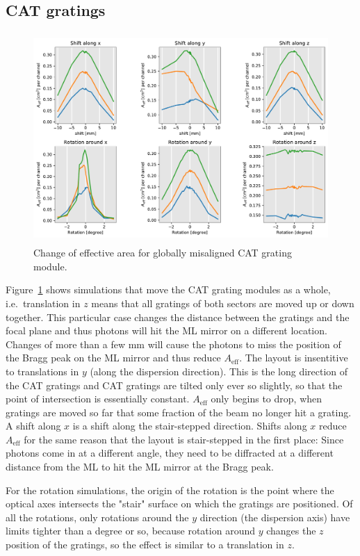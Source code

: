 \documentclass[]{spie}  %
\begin{document}
\subsection{CAT gratings}
\begin{figure} [ht]
  \begin{center}
    \includegraphics[height=8cm]{CAT_global.pdf}
  \end{center}
  \caption
      { \label{fig:CAT_global}Change of effective area for globally misaligned CAT grating module. 
}
\end{figure}
Figure~\ref{fig:CAT_global} shows simulations that move the CAT grating modules as a whole, i.e.\ translation in $z$ means that all gratings of both sectors are moved up or down together. This particular case changes the distance between the gratings and the focal plane and thus photons will hit the ML mirror on a different location. Changes of more than a few mm will cause the photons to miss the position of the Bragg peak on the ML mirror and thus reduce $A_{\mathrm{eff}}$. The layout is insentitive to translations in $y$ (along the dispersion direction). This is the long direction of the CAT gratings and CAT gratings are tilted only ever so slightly, so that the point of intersection is essentially constant. $A_{\mathrm{eff}}$ only begins to drop, when gratings are moved so far that some fraction of the beam no longer hit a grating. A shift along $x$ is a shift along the stair-stepped direction. Shifts along $x$ reduce $A_{\mathrm{eff}}$ for the same reason that the layout is stair-stepped in the first place: Since photons come in at a different angle, they need to be diffracted at a different distance from the ML to hit the ML mirror at the Bragg peak.

For the rotation simulations, the origin of the rotation is the point where the optical axes intersects the "stair" surface on which the gratings are positioned. Of all the rotations, only rotations around the $y$ direction (the dispersion axis) have limits tighter than a degree or so, because rotation around $y$ changes the $z$ position of the gratings, so the effect is similar to a translation in $z$.
\end{document}
